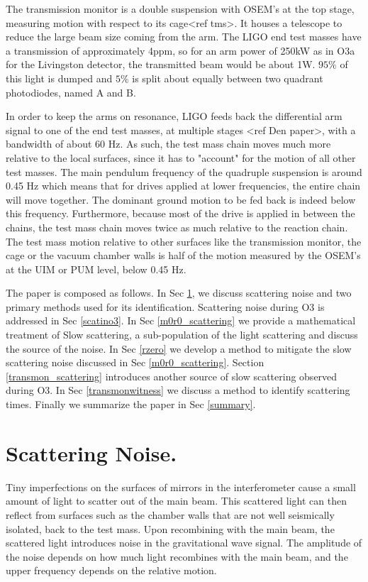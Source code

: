 \documentclass[12pt]{iopart}
\begin{document}
The transmission monitor is a double suspension with OSEM's at the top stage, measuring motion with respect to its cage<ref tms>. It houses a telescope to reduce the large beam size coming from the arm. The LIGO end test masses have a transmission of approximately 4ppm, so for an arm power of 250kW as in O3a for the Livingston detector, the transmitted beam would be about 1W. $95\%$ of this light is dumped and $5\%$ is split about equally between two quadrant photodiodes, named A and B. 

In order to keep the arms on resonance, LIGO feeds back the differential arm signal to one of the end test masses, at multiple stages <ref Den paper>, with a bandwidth of about 60 Hz. As such, the test mass chain moves much more relative to the local surfaces, since it has to "account" for the motion of all other test masses. The main pendulum frequency of the quadruple suspension is around 0.45 Hz which means that for drives applied at lower frequencies, the entire chain will move together. The dominant ground motion to be fed back is indeed below this frequency. Furthermore, because most of the drive is applied in between the chains, the test mass chain moves twice as much relative to the reaction chain. The test mass motion relative to other surfaces like the transmission monitor, the cage or the vacuum chamber walls is half of the motion measured by the OSEM's at the UIM or PUM level, below 0.45 Hz.

 
The paper is composed as follows. In Sec \ref{scatteringnoise}, we discuss scattering noise and two primary methods used for its identification. Scattering noise during O3 is addressed in Sec   \ref{scatino3}. In Sec \ref{m0r0_scattering} we provide a mathematical treatment of Slow scattering, a sub-population of the light scattering and discuss the source of the noise. In Sec \ref{rzero} we develop a method to mitigate the slow scattering noise discussed in Sec \ref{m0r0_scattering}. Section \ref{transmon_scattering} introduces another source of slow scattering observed during O3. In Sec \ref{transmonwitness} we discuss a method to identify scattering times. Finally we summarize the paper in Sec \ref{summary}. 

 
\section{Scattering Noise.}\label{scatteringnoise}
Tiny imperfections on the surfaces of mirrors in the interferometer cause a small amount of light to scatter out of the main beam. This scattered light can then reflect from surfaces such as the chamber walls that are not well seismically isolated, back to the test mass. Upon recombining with the main beam, the scattered light introduces noise in the gravitational wave signal. The amplitude of the noise depends on how much light recombines with the main beam, and the upper frequency depends on the relative motion.
\end{document}
